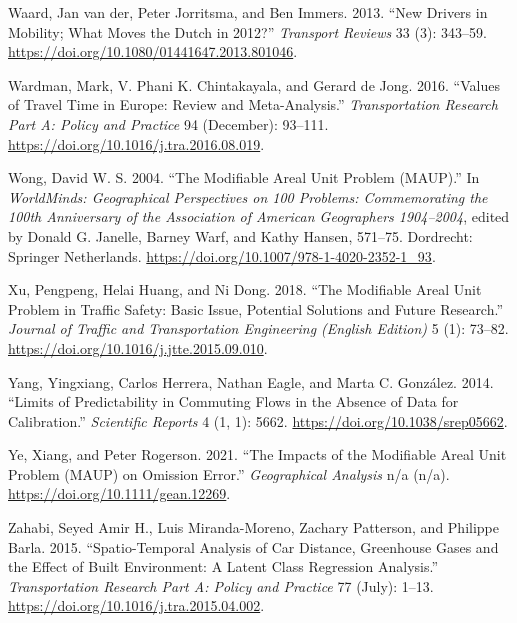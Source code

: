 \documentclass[
  12pt,
]{article}
\newlength{\cslhangindent}
\newlength{\cslentryspacingunit} %
\newenvironment{CSLReferences}[2] %
 {%
  \setlength{\parindent}{0pt}
  \ifodd #1
  \let\oldpar\par
  \def\par{\hangindent=\cslhangindent\oldpar}
  \fi
  \setlength{\parskip}{#2\cslentryspacingunit}
 }%
 {}
\begin{document}
\begin{CSLReferences}{1}{0}
\leavevmode{}%
Waard, Jan van der, Peter Jorritsma, and Ben Immers. 2013. {``New {Drivers} in {Mobility}; {What Moves} the {Dutch} in 2012?''} \emph{Transport Reviews} 33 (3): 343--59. \url{https://doi.org/10.1080/01441647.2013.801046}.

\leavevmode{}%
Wardman, Mark, V. Phani K. Chintakayala, and Gerard de Jong. 2016. {``Values of Travel Time in {Europe}: {Review} and Meta-Analysis.''} \emph{Transportation Research Part A: Policy and Practice} 94 (December): 93--111. \url{https://doi.org/10.1016/j.tra.2016.08.019}.

\leavevmode{}%
Wong, David W. S. 2004. {``The {Modifiable Areal Unit Problem} ({MAUP}).''} In \emph{{WorldMinds}: {Geographical Perspectives} on 100 {Problems}: {Commemorating} the 100th {Anniversary} of the {Association} of {American Geographers} 1904--2004}, edited by Donald G. Janelle, Barney Warf, and Kathy Hansen, 571--75. {Dordrecht}: {Springer Netherlands}. \url{https://doi.org/10.1007/978-1-4020-2352-1_93}.

\leavevmode{}%
Xu, Pengpeng, Helai Huang, and Ni Dong. 2018. {``The Modifiable Areal Unit Problem in Traffic Safety: {Basic} Issue, Potential Solutions and Future Research.''} \emph{Journal of Traffic and Transportation Engineering (English Edition)} 5 (1): 73--82. \url{https://doi.org/10.1016/j.jtte.2015.09.010}.

\leavevmode{}%
Yang, Yingxiang, Carlos Herrera, Nathan Eagle, and Marta C. González. 2014. {``Limits of {Predictability} in {Commuting Flows} in the {Absence} of {Data} for {Calibration}.''} \emph{Scientific Reports} 4 (1, 1): 5662. \url{https://doi.org/10.1038/srep05662}.

\leavevmode{}%
Ye, Xiang, and Peter Rogerson. 2021. {``The {Impacts} of the {Modifiable Areal Unit Problem} ({MAUP}) on {Omission Error}.''} \emph{Geographical Analysis} n/a (n/a). \url{https://doi.org/10.1111/gean.12269}.

\leavevmode{}%
Zahabi, Seyed Amir H., Luis Miranda-Moreno, Zachary Patterson, and Philippe Barla. 2015. {``Spatio-Temporal Analysis of Car Distance, Greenhouse Gases and the Effect of Built Environment: {A} Latent Class Regression Analysis.''} \emph{Transportation Research Part A: Policy and Practice} 77 (July): 1--13. \url{https://doi.org/10.1016/j.tra.2015.04.002}.


\end{CSLReferences}
\end{document}
